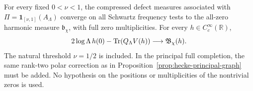 \begin{theorem}
\label{nh:theorem}
For every fixed $0<\nu<1$, the compressed defect measures
associated with $\Pi=\mathbf1_{[\nu,1]}(A_\Lambda)$ converge
on all Schwartz frequency tests to the all-zero harmonic
measure $\mathfrak b_\chi$, with full zero multiplicities.
For every $h\in C_c^\infty(\mathbb R)$,
\begin{equation}\label{nh:trace-limit}
 2\log\Lambda\,h(0)-\operatorname{Tr}(Q_\Lambda V(h))
                              \longrightarrow\mathfrak B_\chi(h).
\end{equation}
The natural threshold $\nu=1/2$ is included.
In the principal full completion, the same rank-two polar
correction as in Proposition~\ref{prop:hecke-principal-graph}
must be added. No hypothesis on the positions or
multiplicities of the nontrivial zeros is used.
\end{theorem}

